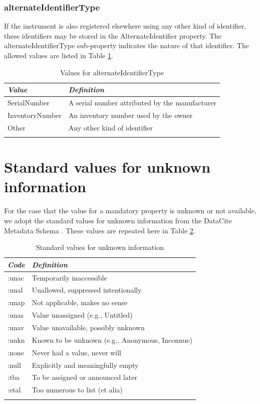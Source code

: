 \documentclass[titlepage=true,twoside=false,DIV=13]{scrartcl}
\begin{document}
\subsubsection{alternateIdentifierType}

If the instrument is also registered elsewhere using any other kind of
identifier, these identifiers may be stored in the AlternateIdentifier
property.  The alternateIdentifierType sub-property indicates the
nature of that identifier.  The allowed values are listed in Table
\ref{tab:schema:values:alternateIdentifierType}.

\begin{longtable}{|l|l|}
  \hline
  \emph{Value} & \emph{Definition} \\
  \hline \endhead
  \hline \endfoot\endlastfoot
  SerialNumber    & A serial number attributed by the manufacturer \\
  InventoryNumber & An inventory number used by the owner \\
  Other           & Any other kind of identifier \\
  \hline
  \caption{Values for alternateIdentifierType}
  \label{tab:schema:values:alternateIdentifierType}
\end{longtable}

\appendix
\clearpage

\section{Standard values for unknown information}
\label{appendix:unknown}

For the case that the value for a mandatory property is unknown or not
available, we adopt the standard values for unknown information from
the DataCite Metadata Schema \cite{datacite:schema}.  These values are
repeated here in Table \ref{tab:appendix:unknown}.

\begin{longtable}{|l|l|}
  \hline
  \emph{Code} & \emph{Definition} \\
  \hline \endhead
  \hline \endfoot\endlastfoot
  :unac & Temporarily inaccessible \\
  :unal & Unallowed, suppressed intentionally \\
  :unap & Not applicable, makes no sense \\
  :unas & Value unassigned (e.g., Untitled) \\
  :unav & Value unavailable, possibly unknown \\
  :unkn & Known to be unknown (e.g., Anonymous, Inconnue) \\
  :none & Never had a value, never will \\
  :null & Explicitly and meaningfully empty \\
  :tba  & To be assigned or announced later \\
  :etal & Too numerous to list (et alia) \\
  \hline
  \caption{Standard values for unknown information}
  \label{tab:appendix:unknown}
\end{longtable}
\end{document}
